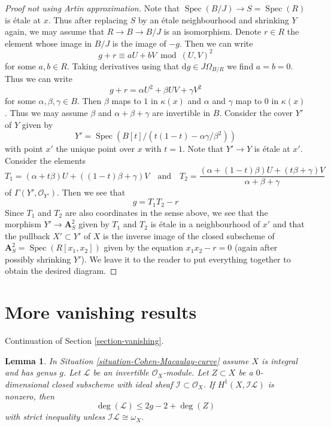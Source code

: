\documentclass{stacks-project}
\theoremstyle{plain}
\newtheorem{lemma}[subsection]{Lemma}
\theoremstyle{definition}
\theoremstyle{remark}
\numberwithin{equation}{subsection}
\def\Spec{\mathop{\mathrm{Spec}}}
\begin{document}
\begin{proof}[Proof not using Artin approximation]
\medskip\noindent
Note that $\Spec(B/J) \to S = \Spec(R)$ is \'etale at $x$.
Thus after replacing $S$ by an \'etale neighbourhood and shrinking
$Y$ again, we may assume that $R \to B \to B/J$ is an isomorphism.
Denote $r \in R$ the element whose image in $B/J$ is the image of $-g$.
Then we can write
$$
g + r \equiv a U + b V \bmod (U, V)^2
$$
for some $a, b \in R$. Taking derivatives using that
$\text{d}g \in J\Omega_{B/R}$ we find $a = b = 0$.
Thus we can write
$$
g + r = \alpha U^2 + \beta UV + \gamma V^2
$$
for some $\alpha, \beta, \gamma \in B$. Then
$\beta$ maps to $1$ in $\kappa(x)$ and $\alpha$ and $\gamma$
map to $0$ in $\kappa(x)$.
Thus we may assume $\beta$ and $\alpha + \beta + \gamma$
are invertible in $B$. Consider the cover $Y'$ of $Y$ given by
$$
Y' = \Spec(B[t]/(t(1 - t) - \alpha \gamma / \beta^2))
$$
with point $x'$ the unique point over $x$ with $t = 1$.
Note that $Y' \to Y$ is \'etale at $x'$.
Consider the elements
$$
T_1 = (\alpha + t \beta)U + ((1 - t)\beta + \gamma)V
\quad\text{and}\quad
T_2 =
\frac{(\alpha + (1 - t) \beta)U + (t\beta + \gamma)V}{\alpha + \beta + \gamma}
$$
of $\Gamma(Y', \mathcal{O}_{Y'})$. Then we see that
$$
g = T_1 T_2 - r
$$
Since $T_1$ and $T_2$ are also coordinates in the sense above,
we see that the morphism $Y' \to \mathbf{A}^2_S$ given by $T_1$ and $T_2$
is \'etale in a neighbourhood of $x'$ and that the pullback
$X' \subset Y'$ of $X$ is the inverse image of the closed subscheme
of $\mathbf{A}^2_S = \Spec(R[x_1, x_2])$ given by the equation
$x_1x_2 - r = 0$ (again after possibly shrinking $Y'$).
We leave it to the reader to put everything together to
obtain the desired diagram.
\end{proof}




\section{More vanishing results}
\label{section-more-vanishing}

\noindent
Continuation of Section \ref{section-vanishing}.

\begin{lemma}
\label{lemma-h1-nonzero-degree-leq-2g-2}
In Situation \ref{situation-Cohen-Macaulay-curve} assume $X$ is integral and
has genus $g$. Let $\mathcal{L}$ be an invertible $\mathcal{O}_X$-module.
Let $Z \subset X$ be a $0$-dimensional closed subscheme with ideal
sheaf $\mathcal{I} \subset \mathcal{O}_X$. If $H^1(X, \mathcal{I}\mathcal{L})$
is nonzero, then
$$
\deg(\mathcal{L}) \leq 2g - 2 + \deg(Z)
$$
with strict inequality unless $\mathcal{I}\mathcal{L} \cong \omega_X$.
\end{lemma}
\end{document}
